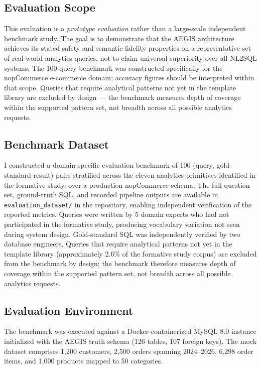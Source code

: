 \documentclass[11pt]{article}
\begin{document}
\subsection{Evaluation Scope}
This evaluation is a \emph{prototype evaluation} rather than a large-scale independent benchmark study. The goal is to demonstrate that the AEGIS architecture achieves its stated safety and semantic-fidelity properties on a representative set of real-world analytics queries, not to claim universal superiority over all NL2SQL systems. The 100-query benchmark was constructed specifically for the nopCommerce e-commerce domain; accuracy figures should be interpreted within that scope. Queries that require analytical patterns not yet in the template library are excluded by design --- the benchmark measures depth of coverage within the supported pattern set, not breadth across all possible analytics requests.

\subsection{Benchmark Dataset}
I constructed a domain-specific evaluation benchmark of 100 (query, gold-standard result) pairs stratified across the eleven analytics primitives identified in the formative study, over a production nopCommerce schema. The full question set, ground-truth SQL, and recorded pipeline outputs are available in \texttt{evaluation\_dataset/} in the repository, enabling independent verification of the reported metrics. Queries were written by 5 domain experts who had not participated in the formative study, producing vocabulary variation not seen during system design. Gold-standard SQL was independently verified by two database engineers. Queries that require analytical patterns not yet in the template library (approximately 2.6\% of the formative study corpus) are excluded from the benchmark by design; the benchmark therefore measures depth of coverage within the supported pattern set, not breadth across all possible analytics requests.

\subsection{Evaluation Environment}
The benchmark was executed against a Docker-containerized MySQL 8.0 instance initialized with the AEGIS truth schema (126 tables, 107 foreign keys). The mock dataset comprises 1,200 customers, 2,500 orders spanning 2024--2026, 6,298 order items, and 1,000 products mapped to 50 categories.
\end{document}
